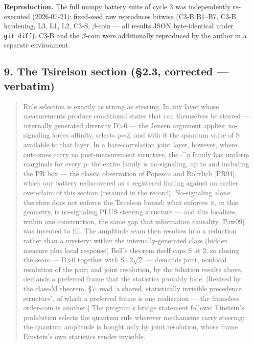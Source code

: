 \documentclass[
  11pt]{article}
\begin{document}
\textbf{Reproduction.} The full numpy battery suite of cycle 3 was
independently re-executed (2026-07-21); fixed-seed raw reproduces
bitwise (C3-B B1--B7, C3-B hardening, L3, L1, L2, C3-S, $\beta$-coin --- all
results JSON byte-identical under \texttt{git\ diff}). C3-B and the
$\beta$-coin were additionally reproduced by the author in a separate
environment.

\subsection{9. The Tsirelson section (\S2.3, corrected ---
verbatim)}\label{the-tsirelson-section-2.3-corrected-verbatim}

\begin{quote}
Rule selection is exactly as strong as steering. In any layer whose
measurements produce conditional states that can themselves be steered
--- internally generated diversity D\textgreater0 --- the Jensen
argument applies: no-signaling forces affinity, selects p=2, and with it
the quantum value of S available to that layer. In a bare-correlation
joint layer, however, where outcomes carry no post-measurement
structure, the \textbar$\cdot$\textbar\^{}p family has uniform marginals for
every p: the entire family is no-signaling, up to and including the PR
box --- the classic observation of Popescu and Rohrlich {[}PR94{]},
which our battery rediscovered as a registered finding against an
earlier over-claim of this section (retained in the record).
No-signaling alone therefore does not enforce the Tsirelson bound; what
enforces it, in this geometry, is no-signaling PLUS steering structure
--- and this localizes, within one construction, the same gap that
information causality {[}Paw09{]} was invented to fill. The amplitude
seam then resolves into a reduction rather than a mystery: within the
internally-generated class (hidden measure plus local response) Bell's
theorem itself caps S at 2, so closing the seam --- D\textgreater0
together with S=$2\sqrt{2}$ --- demands joint, nonlocal resolution of the pair;
and joint resolution, by the foliation results above, demands a
preferred frame that the statistics provably hide. {[}Revised by the
class-M theorem, \S7: read `a shared, statistically invisible precedence
structure', of which a preferred frame is one realization --- the
frameless order-coin is another.{]} The program's bridge statement
follows: Einstein's prohibition selects the quantum rule wherever
mechanisms carry steering; the quantum amplitude is bought only by joint
resolution, whose frame Einstein's own statistics render invisible.
\end{quote}
\end{document}
